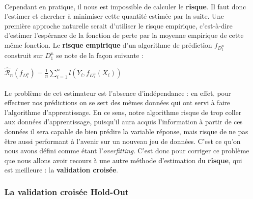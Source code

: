 \documentclass[14pt, openany]{article}
\begin{document}
\paragraph{}
Cependant en pratique, il nous est impossible de calculer le \textbf{risque}. Il faut donc l'estimer et chercher à minimiser cette quantité estimée par la suite. Une première approche naturelle serait d'utiliser le risque empirique, c'est-à-dire d'estimer l'espérance de la fonction de perte par la moyenne empirique de cette même fonction. Le \textbf{risque empirique} d'un algorithme de prédiction $f_{D^{n}_{1}}$ construit sur $D^{n}_{1}$ se note de la façon suivante :
\begin{center}
$\widehat{\mathcal{R}}_n(f_{D^{n}_{1}}) = \frac{1}{n} \sum\limits_{i=1}^n l(Y_i,f_{D^{n}_{1}}(X_i))$
\end{center}

\paragraph{}
Le problème de cet estimateur est l'absence d'indépendance : en effet, pour effectuer nos prédictions on se sert des mêmes données qui ont servi à faire l'algorithme d'apprentissage. En ce sens, notre algorithme risque de trop \og coller \fg{} aux données d'apprentissage, puisqu'il aura acquis l'information à partir de ces données il sera capable de bien prédire la variable réponse, mais risque de ne pas être aussi performant à l'avenir sur un nouveau jeu de données. C'est ce qu'on nous avons défini comme étant l'\textit{overfitting}. C'est donc pour corriger ce problème que nous allons avoir recours à une autre méthode d'estimation du \textbf{risque}, qui est meilleure : la \textbf{validation croisée}.

\subsubsection{La validation croisée Hold-Out}
\end{document}
